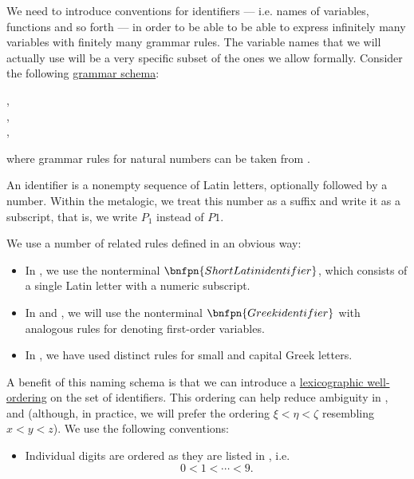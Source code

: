 \begin{remark}\label{rem:grammar_rules_for_variables}
  We need to introduce conventions for identifiers --- i.e. names of variables, functions and so forth --- in order to be able to be able to express infinitely many variables with finitely many grammar rules. The variable names that we will actually use will be a very specific subset of the ones we allow formally. Consider the following \hyperref[def:formal_grammar/schema]{grammar schema}:
  \begin{bnf*}
               { \bnfor {} \bnfor \cdots \bnfor {} \bnfor {} \bnfor {} \bnfor \cdots \bnfor {}}, \\
               { \bnfor {} \bnfsp {}}, \\
           { \bnfor {} \bnfsp {}},
  \end{bnf*}
  where grammar rules for natural numbers can be taken from .

  An identifier is a nonempty sequence of Latin letters, optionally followed by a number. Within the metalogic, we treat this number as a suffix and write it as a subscript, that is, we write \( P_1 \) instead of \( P1 \).

  We use a number of related rules defined in an obvious way:
  \begin{itemize}
    \item In , we use the nonterminal \( \bnfpn{Short Latin identifier} \), which consists of a single Latin letter with a numeric subscript.
    \item In  and , we will use the nonterminal \( \bnfpn{Greek identifier} \) with analogous rules for denoting first-order variables.
    \item In , we have used distinct rules for small and capital Greek letters.
  \end{itemize}

  A benefit of this naming schema is that we can introduce a \hyperref[thm:def:well_ordered_set/lexicographic]{lexicographic well-ordering} on the set of identifiers. This ordering can help reduce ambiguity in ,  and  (although, in practice, we will prefer the ordering \( \xi < \eta < \zeta \) resembling \( x < y < z \)). We use the following conventions:
  \begin{itemize}
    \item Individual digits are ordered as they are listed in , i.e.
    \begin{equation*}
      0 < 1 < \cdots < 9.
    \end{equation*}


\end{itemize}
\end{remark}
